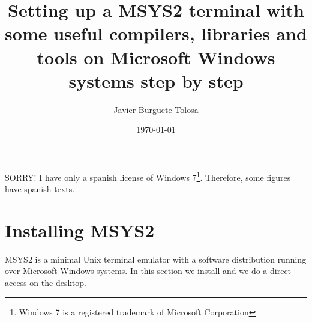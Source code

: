 \documentclass[a4paper]{article}
\title{Setting up a MSYS2 terminal with some useful compilers, libraries
and tools on Microsoft Windows systems step by step}
\author{Javier Burguete Tolosa}
\date{\today}
\begin{document}
\maketitle

\tableofcontents

\section*{}

SORRY! I have only a spanish license of Windows 7\footnote{Windows 7 is a
registered trademark of Microsoft Corporation}. Therefore, some figures have
spanish texts.

\clearpage

\section{Installing MSYS2}

MSYS2 is a minimal Unix terminal emulator with a software distribution running
over Microsoft Windows systems. In this section we install and we do a direct
access on the desktop.
\end{document}
